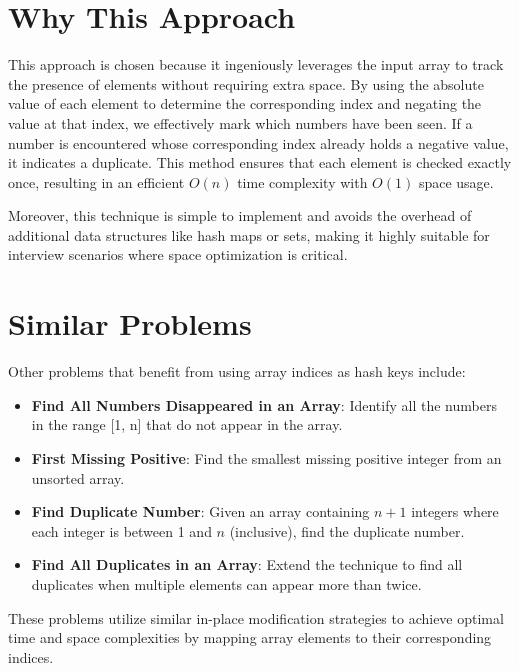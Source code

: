 \section*{Why This Approach}

This approach is chosen because it ingeniously leverages the input array to track the presence of elements without requiring extra space. By using the absolute value of each element to determine the corresponding index and negating the value at that index, we effectively mark which numbers have been seen. If a number is encountered whose corresponding index already holds a negative value, it indicates a duplicate. This method ensures that each element is checked exactly once, resulting in an efficient \(O(n)\) time complexity with \(O(1)\) space usage.

Moreover, this technique is simple to implement and avoids the overhead of additional data structures like hash maps or sets, making it highly suitable for interview scenarios where space optimization is critical.

\section*{Similar Problems}

Other problems that benefit from using array indices as hash keys include:

\begin{itemize}
    \item \textbf{Find All Numbers Disappeared in an Array}: Identify all the numbers in the range [1, n] that do not appear in the array.
    
    \item \textbf{First Missing Positive}: Find the smallest missing positive integer from an unsorted array.
    
    \item \textbf{Find Duplicate Number}: Given an array containing \(n + 1\) integers where each integer is between 1 and \(n\) (inclusive), find the duplicate number.
    
    \item \textbf{Find All Duplicates in an Array}: Extend the technique to find all duplicates when multiple elements can appear more than twice.
\end{itemize}

These problems utilize similar in-place modification strategies to achieve optimal time and space complexities by mapping array elements to their corresponding indices.

